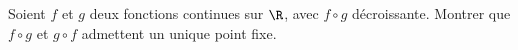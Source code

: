 \begin{enonce}
\begin{exercise}[ID={RMS127 E721},subtitle={Mines-Ponts PSI 2016},tags={}]
Soient $f$ et $g$ deux fonctions continues sur $\R$, avec $f\circ g$ décroissante.
Montrer que $f\circ g$ et $g\circ f$ admettent un unique point fixe.
\end{exercise}
\begin{solution}
\end{solution}
\end{enonce}
